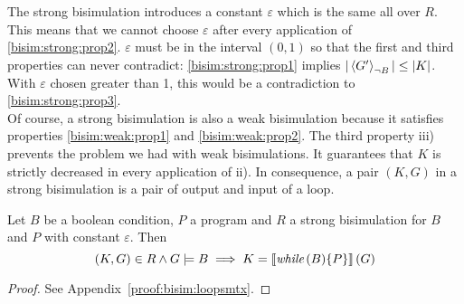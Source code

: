 The strong bisimulation introduces a constant $\varepsilon$ which is the same all over $R$.
This means that we cannot choose $\varepsilon$ after every application of \ref{bisim:strong:prop2}.
$\varepsilon$ must be in the interval $(0, 1)$ so that the first and third properties can never contradict:
\ref{bisim:strong:prop1} implies $|\left\langle G' \right\rangle_{\lnot B}| \leq |K|$.
With $\varepsilon$ chosen greater than 1, this would be a contradiction to \ref{bisim:strong:prop3}. \\
Of course, a strong bisimulation is also a weak bisimulation because it satisfies properties \ref{bisim:weak:prop1} and \ref{bisim:weak:prop2}.
The third property iii) prevents the problem we had with weak bisimulations.
It guarantees that $K$ is strictly decreased in every application of ii).
In consequence, a pair $(K, G)$ in a strong bisimulation is a pair of output and input of a loop.

\begin{theorem}[label=theo:bisim:loopsmtx]
	Let $B$ be a boolean condition, $P$ a program and $R$ a strong bisimulation for $B$ and $P$ with constant $\varepsilon$. Then
	\[ \left( K, G \right) \in R \land G \models B \implies K = \left\llbracket \textit{while}\,(B) \{P\} \right\rrbracket(G) \]
	\begin{proof}
		See Appendix~\ref{proof:bisim:loopsmtx}.
	\end{proof}
\end{theorem}



